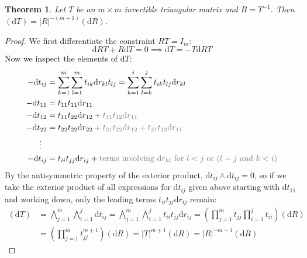 \documentclass[12pt,a4paper,reqno]{amsart}
\numberwithin{equation}{section}
\newtheorem{theorem}{Theorem}[section]
\renewcommand{\det}[1]{\left| {#1} \right|}
\newcommand{\dmeasure}[1]{\left(\dd{#1}\right)}
\newcommand{\dd}[1]{\mathrm{d}{#1}}
\begin{document}
\begin{theorem}\label{thm:triinvjac}
    Let $T$ be an $m \times m$ invertible triangular matrix and $R=T^{-1}$.
    Then $\dmeasure{T} = \det{R}^{-(m+1)} \dmeasure{R}$.
\end{theorem}
\begin{proof}
    We first differentiate the constraint $R T = I_m$:
    \[
        \dd{R} T + R \dd{T} = 0 \implies \dd{T} = -T \dd{R}T
    \]
    Now we inspect the elements of $\dd{T}$:
    \begin{align*}
        -\dd{t}_{ij} & = \sum_{k=1}^m \sum_{l=1}^m t_{ik} \dd{r}_{kl} t_{lj} = \sum_{k=1}^i \sum_{l=k}^j t_{ik} t_{lj} \dd{r}_{kl}                                         \\
        -\dd{t}_{11} & = t_{11} t_{11} \dd{r}_{11}                                                                                                                         \\
        -\dd{t}_{12} & = t_{11} t_{22} \dd{r}_{12} + \textcolor{medium-gray}{t_{11} t_{12} \dd{r}_{11}}                                                                    \\
        -\dd{t}_{22} & = t_{22} t_{22} \dd{r}_{22} + \textcolor{medium-gray}{t_{21} t_{22} \dd{r}_{12} + t_{21} t_{12} \dd{r}_{11}}                                        \\
        \vdots \ \   &                                                                                                                                                     \\
        -\dd{t}_{ij} & = t_{ii} t_{jj}\dd{r}_{ij} + \textcolor{medium-gray}{\text{terms involving } \dd{r}_{kl} \text{ for } l < j \text{ or } (l = j \text{ and } k < i)}
    \end{align*}
    By the antisymmetric property of the exterior product, $\dd{t}_{ij} \wedge \dd{t}_{ij} = 0$, so if we take the exterior product of all expressions for $\dd{t}_{ij}$ given above starting with $\dd{t}_{11}$ and working down, only the leading terms $t_{ii} t_{jj} \dd{r}_{ij}$ remain:
    \begin{align*}
        \dmeasure{T} & = \bigwedge_{j=1}^m \bigwedge_{i=1}^j \dd{t}_{ij} = \bigwedge_{j=1}^m \bigwedge_{i=1}^j t_{ii} t_{jj} \dd{r}_{ij} = \left(\prod_{j=1}^m t_{jj} \prod_{i=1}^j t_{ii} \right) \dmeasure{R} \\
                     & =\left(\prod_{j=1}^m t_{jj}^{m+1}\right) \dmeasure{R} = \det{T}^{m+1} \dmeasure{R} = \det{R}^{-m-1} \dmeasure{R}
    \end{align*}
\end{proof}
\end{document}
